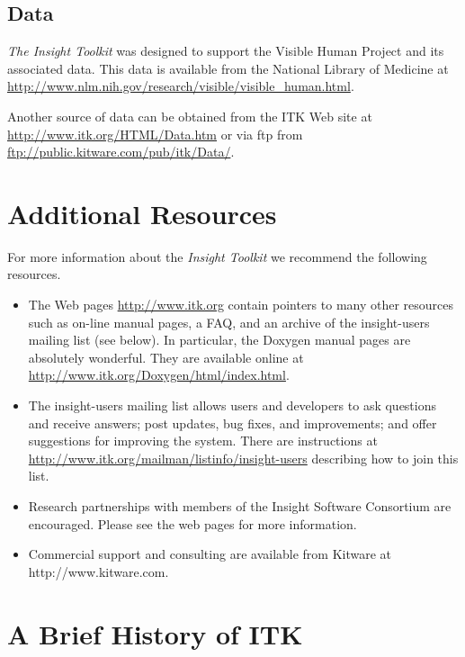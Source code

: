 \subsection{Data}
\label{sec:Data}

\emph{The Insight Toolkit} was designed to support the Visible Human Project 
and its associated data. This data is available from the National Library of
Medicine at \url{http://www.nlm.nih.gov/research/visible/visible_human.html}.

Another source of data can be obtained from the ITK Web site at 
\url{http://www.itk.org/HTML/Data.htm} or via ftp from
\url{ftp://public.kitware.com/pub/itk/Data/}.

\section{Additional Resources}
\label{sec:AdditionalResources}

For more information about the \emph{Insight Toolkit} we recommend the
following resources.

\begin{itemize}
	\item The Web pages \url{http://www.itk.org} contain pointers to
	many other resources such as on-line manual pages, a FAQ, and an
	archive of the insight-users mailing list (see below). In particular,
	the Doxygen manual pages are absolutely wonderful. They are 
        available online at \url{http://www.itk.org/Doxygen/html/index.html}.

	\item The insight-users mailing list allows users and developers to ask
	questions and receive answers; post updates, bug fixes, and
	improvements; and offer suggestions for improving the system. There
	are instructions at 
        \url{http://www.itk.org/mailman/listinfo/insight-users}
	describing how to join this list.

        \item Research partnerships with members of the Insight Software
        Consortium are encouraged. Please see the web pages for more 
        information.

	\item Commercial support and consulting are available from Kitware at
	http://www.kitware.com. 
\end{itemize}

\section{A Brief History of ITK}
\label{sec:History}

